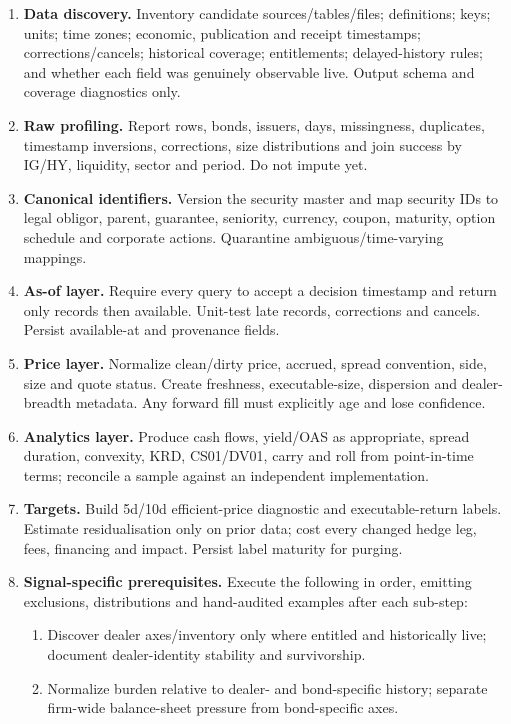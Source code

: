 \documentclass[10pt]{article}
\begin{document}
\begin{enumerate}[leftmargin=2em,label=\textbf{A\arabic*.}]
\item \textbf{Data discovery.} Inventory candidate sources/tables/files; definitions; keys; units; time zones; economic, publication and receipt timestamps; corrections/cancels; historical coverage; entitlements; delayed-history rules; and whether each field was genuinely observable live. Output schema and coverage diagnostics only.
\item \textbf{Raw profiling.} Report rows, bonds, issuers, days, missingness, duplicates, timestamp inversions, corrections, size distributions and join success by IG/HY, liquidity, sector and period. Do not impute yet.
\item \textbf{Canonical identifiers.} Version the security master and map security IDs to legal obligor, parent, guarantee, seniority, currency, coupon, maturity, option schedule and corporate actions. Quarantine ambiguous/time-varying mappings.
\item \textbf{As-of layer.} Require every query to accept a decision timestamp and return only records then available. Unit-test late records, corrections and cancels. Persist available-at and provenance fields.
\item \textbf{Price layer.} Normalize clean/dirty price, accrued, spread convention, side, size and quote status. Create freshness, executable-size, dispersion and dealer-breadth metadata. Any forward fill must explicitly age and lose confidence.
\item \textbf{Analytics layer.} Produce cash flows, yield/OAS as appropriate, spread duration, convexity, KRD, CS01/DV01, carry and roll from point-in-time terms; reconcile a sample against an independent implementation.
\item \textbf{Targets.} Build 5d/10d efficient-price diagnostic and executable-return labels. Estimate residualisation only on prior data; cost every changed hedge leg, fees, financing and impact. Persist label maturity for purging.
\item \textbf{Signal-specific prerequisites.} Execute the following in order, emitting exclusions, distributions and hand-audited examples after each sub-step:
\begin{enumerate}[label=\alph*)]
\item Discover dealer axes/inventory only where entitled and historically live; document dealer-identity stability and survivorship.
\item Normalize burden relative to dealer- and bond-specific history; separate firm-wide balance-sheet pressure from bond-specific axes.

\end{enumerate}
\end{enumerate}
\end{document}
